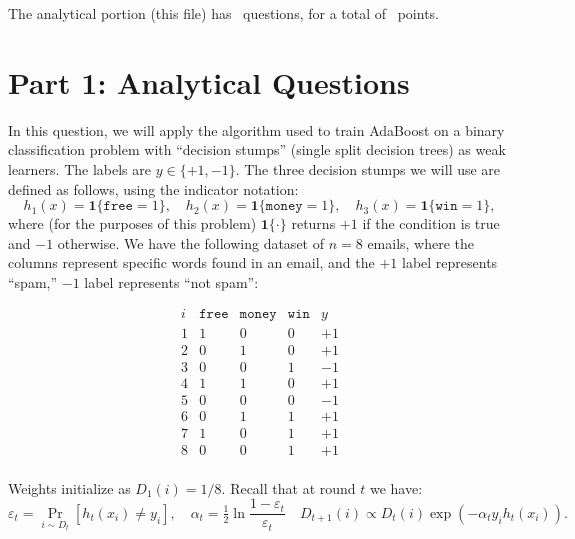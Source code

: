 \documentclass[11pt,addpoints,answers]{exam}
\begin{document}
\begin{center}
The analytical portion (this file) has \numquestions\ questions, for a total of \numpoints\
points.
\end{center}

\newpage

\section*{Part 1: Analytical Questions}

\begin{questions}
\question%
In this question, we will apply the algorithm used to train AdaBoost on a binary classification problem with ``decision stumps'' (single split decision trees) as weak learners. The labels are $y \in \{+1,-1\}$.
The three decision stumps we will use are defined as follows, using the indicator notation:
\[
h_1(x) = \mathbf{1}\{\texttt{free}=1\}, \quad
h_2(x) = \mathbf{1}\{\texttt{money}=1\}, \quad
h_3(x) = \mathbf{1}\{\texttt{win}=1\},
\]
where (for the purposes of this problem) $\mathbf{1}\{\cdot\}$ returns $+1$ if the condition is true and $-1$ otherwise.  
We have the following dataset of $n=8$ emails, where the columns represent specific words found in an email, and the $+1$ label represents ``spam,'' $-1$ label represents ``not spam'':

\[
\begin{array}{c|c|c|c|c}
i & \texttt{free} & \texttt{money} & \texttt{win} & y \\
\hline
1 & 1 & 0 & 0 & +1 \\
2 & 0 & 1 & 0 & +1 \\
3 & 0 & 0 & 1 & -1 \\
4 & 1 & 1 & 0 & +1 \\
5 & 0 & 0 & 0 & -1 \\
6 & 0 & 1 & 1 & +1 \\
7 & 1 & 0 & 1 & +1 \\
8 & 0 & 0 & 1 & +1 \\
\end{array}
\]

Weights initialize as $D_1(i)=1/8$.  
Recall that at round $t$ we have:
\[
\varepsilon_t = \Pr_{i \sim D_t}[h_t(x_i)\neq y_i], \quad
\alpha_t = \tfrac12 \ln \frac{1-\varepsilon_t}{\varepsilon_t} \quad
D_{t+1}(i) \propto D_t(i) \exp(-\alpha_t y_i h_t(x_i)).
\]

\end{questions}
\end{document}
